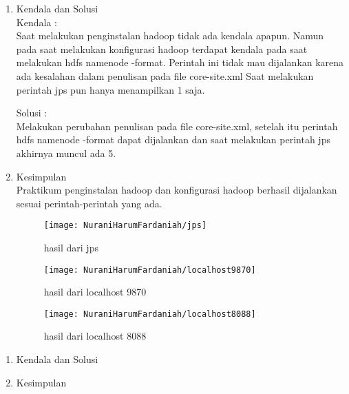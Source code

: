 
\begin{enumerate}
\item Kendala dan Solusi \\
Kendala :\\
Saat melakukan penginstalan hadoop tidak ada kendala apapun. Namun pada saat melakukan konfigurasi hadoop terdapat kendala pada saat melakukan hdfs namenode -format. Perintah ini tidak mau dijalankan karena ada kesalahan dalam penulisan pada file core-site.xml
Saat melakukan perintah jps pun hanya menampilkan 1 saja.

Solusi :\\
Melakukan perubahan penulisan pada file core-site.xml, setelah itu perintah hdfs namenode -format dapat dijalankan dan saat melakukan perintah jps akhirnya muncul ada 5.

\item Kesimpulan \\
Praktikum penginstalan hadoop dan konfigurasi hadoop berhasil dijalankan sesuai perintah-perintah yang ada.

\begin{figure}[!ht]
\texttt{[image: NuraniHarumFardaniah/jps]}
\caption{hasil dari jps}
\label{gam:perkuliahan-25-11}
\end{figure}

\begin{figure}[!ht]
\texttt{[image: NuraniHarumFardaniah/localhost9870]}
\caption{hasil dari localhost 9870}
\label{gam:perkuliahan-25-11}
\end{figure}

\newpage
\begin{figure}[!ht]
\texttt{[image: NuraniHarumFardaniah/localhost8088]}
\caption{hasil dari localhost 8088}
\label{gam:perkuliahan-25-11}
\end{figure}

\end{enumerate}

\begin{enumerate}
\item Kendala dan Solusi

\item Kesimpulan

\end{enumerate}

